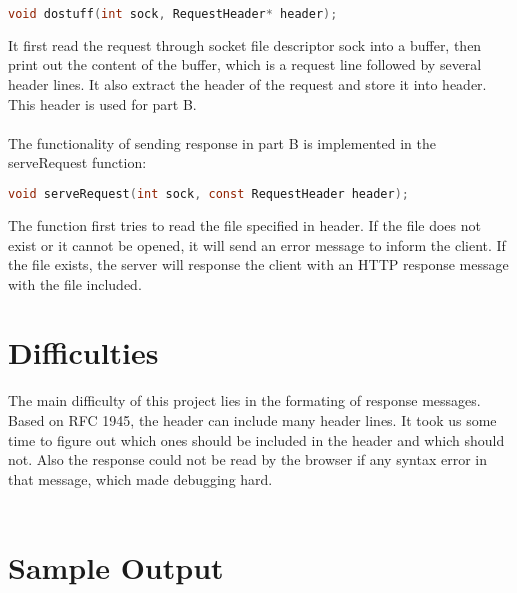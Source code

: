\documentclass[a4paper, 11pt]{report}
\begin{document}
\begin{lstlisting}[language=C]
void dostuff(int sock, RequestHeader* header);
\end{lstlisting}

\noindent It first read the request through socket file descriptor {\selectfont sock} into a buffer, then print out the content of the buffer, which is a request line followed by several header lines. It also extract the header of the request and store it into {\selectfont header}. This header is used for part B.\\\\

\noindent The functionality of sending response in part B is implemented in the {\selectfont serveRequest} function:

\begin{lstlisting}[language=C]
void serveRequest(int sock, const RequestHeader header);
\end{lstlisting}

\noindent The function first tries to read the file specified in {\selectfont header}. If the file does not exist or it cannot be opened, it will send an error message to inform the client. If the file exists, the server will response the client with an HTTP response message with the file included.


\section*{Difficulties}

The main difficulty of this project lies in the formating of response messages. Based on RFC 1945, the header can include many header lines. It took us some time to figure out which ones should be included in the header and which should not. Also the response could not be read by the browser if any syntax error in that message, which made debugging hard.\\\\


\section*{Sample Output}

\end{document}
